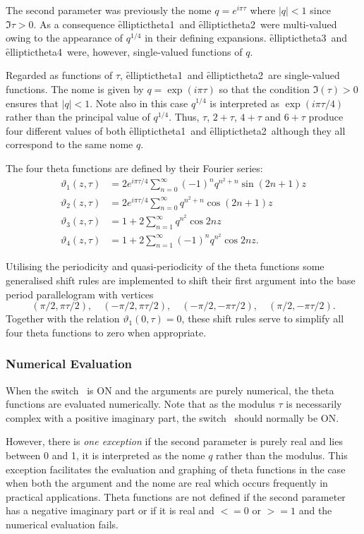 The second parameter was previously the nome $q=e^{i\pi\tau}$ where $|q|<1$
since $\Im\tau>0$.
As a consequence \f{elliptictheta1}\ and \f{elliptictheta2}\ were multi-valued
owing to the appearance of $q^{1/4}$ in their defining expansions.
\f{elliptictheta3}\ and \f{elliptictheta4}\ were, however, single-valued
functions of $q$.

Regarded as functions of $\tau$,
\f{elliptictheta1}\ and \f{elliptictheta2}\ are single-valued functions. The
nome is given by $q = \exp(i\pi\tau)$  so that the condition $\Im(\tau)>0$
ensures that $|q| < 1$. Note also  in this case $q^{1/4}$ is interpreted as
$\exp(i\pi\tau/4)$ rather than the principal value of $q^{1/4}$.
Thus, $\tau$, $2+\tau$, $4+\tau$ and $6+\tau$ produce four different values of
both \f{elliptictheta1}\ and \f{elliptictheta2}\ although they all correspond to
the same nome $q$.

The four theta functions are defined by their Fourier series:
\begin{align*}
  \vartheta_1(z,\tau) & = 2 e^{i\pi\tau/4}\sum_{n=0}^\infty (-1)^nq^{n^2+n} \sin(2n+1)z\\
\vartheta_2(z,\tau) & = 2 e^{i\pi\tau/4}\sum_{n=0}^\infty q^{n^2+n} \cos(2n+1)z\\
\vartheta_3(z,\tau) & = 1 +2\sum_{n=1}^\infty q^{n^2} \cos 2n z\\
\vartheta_4(z,\tau) & = 1 +2\sum_{n=1}^\infty (-1)^n q^{n^2} \cos 2n z.
\end{align*}

Utilising the periodicity and quasi-periodicity of the theta functions
some generalised shift rules are implemented to shift their first argument
into the base period parallelogram with vertices
\[(\pi/2, \pi\tau/2),\quad (-\pi/2, \pi\tau/2),\quad (-\pi/2, -\pi\tau/2),
\quad (\pi/2, -\pi\tau/2).\]
Together with the relation $\vartheta_1(0,\tau)=0$,  these shift rules serve to
simplify all four theta functions to zero when appropriate.

\subsubsection{Numerical Evaluation}
When the switch \ is ON and the arguments are
purely numerical, the theta functions are evaluated numerically.
Note that as the modulus $\tau$ is necessarily complex with a positive
imaginary part, the switch \ should normally be ON.

However, there is \emph{one exception} if the second parameter is purely real
and lies between 0 and 1, it is interpreted as the nome $q$ rather than the
modulus. This exception facilitates the evaluation and graphing of theta
functions in the case when both the argument and the nome are real which occurs
frequently in practical applications.  Theta functions are not defined if the
second parameter has a negative imaginary part or if it is real and
$<= 0$ or $>=1$ and the numerical evaluation fails.


